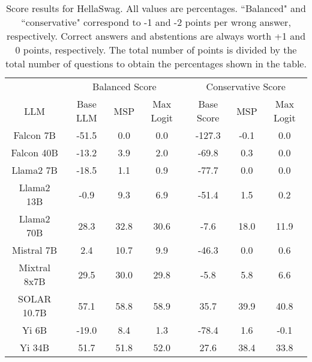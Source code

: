 \renewcommand\arraystretch{1.2}
\begin{table*}
\centering
\begin{tabular}{c|c|c|c|c|c|c}
& \multicolumn{3}{c|}{Balanced Score} & \multicolumn{3}{c}{Conservative Score} \\ 
LLM & Base LLM & MSP & Max Logit & Base Score & MSP & Max Logit\\ \hline
Falcon 7B & -51.5 & 0.0 & 0.0 & -127.3 & -0.1 & 0.0\\
Falcon 40B & -13.2 & 3.9 & 2.0 & -69.8 & 0.3 & 0.0\\
Llama2 7B & -18.5 & 1.1 & 0.9 & -77.7 & 0.0 & 0.0\\
Llama2 13B & -0.9 & 9.3 & 6.9 & -51.4 & 1.5 & 0.2\\
Llama2 70B & 28.3 & 32.8 & 30.6 & -7.6 & 18.0 & 11.9\\
Mistral 7B & 2.4 & 10.7 & 9.9 & -46.3 & 0.0 & 0.6\\
Mixtral 8x7B & 29.5 & 30.0 & 29.8 & -5.8 & 5.8 & 6.6\\
SOLAR 10.7B & 57.1 & 58.8 & 58.9 & 35.7 & 39.9 & 40.8\\
Yi 6B & -19.0 & 8.4 & 1.3 & -78.4 & 1.6 & -0.1\\
Yi 34B & 51.7 & 51.8 & 52.0 & 27.6 & 38.4 & 33.8\\
\hline
\end{tabular}
\caption{Score results for HellaSwag. All values are percentages. ``Balanced" and ``conservative" correspond to -1 and -2 points per wrong answer, respectively. Correct answers and abstentions are always worth +1 and 0 points, respectively. The total number of points is divided by the total number of questions to obtain the percentages shown in the table.}
\label{tab:hellaswag_score}
\end{table*}
